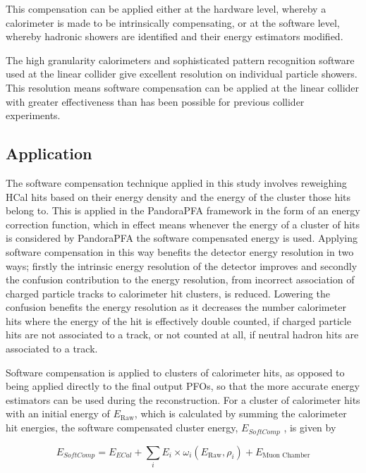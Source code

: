 This compensation can be applied either at the hardware level, whereby a calorimeter is made to be intrinsically compensating, or at the software level, whereby hadronic showers are identified and their energy estimators modified.  

The high granularity calorimeters and sophisticated pattern recognition software used at the linear collider give excellent resolution on individual particle showers.  This resolution means software compensation can be applied at the linear collider with greater effectiveness than has been possible for previous collider experiments.  


\subsection{Application}
The software compensation technique applied in this study involves reweighing HCal \text{ } hits based on their energy density and the energy of the cluster those hits belong to.  This is applied in the PandoraPFA framework in the form of an energy correction function, which in effect means whenever the energy of a cluster of hits is considered by PandoraPFA the software compensated energy is used.  Applying software compensation in this way benefits the detector energy resolution in two ways; firstly the intrinsic energy resolution of the detector improves and secondly the confusion contribution to the energy resolution, from incorrect association of charged particle tracks to calorimeter hit clusters, is reduced.  Lowering the confusion benefits the energy resolution as it decreases the number calorimeter hits where the energy of the hit is effectively double counted, if charged particle hits are not associated to a track, or not counted at all, if neutral hadron hits are associated to a track.   

Software compensation is applied to clusters of calorimeter hits, as opposed to being applied directly to the final output PFOs, so that the more accurate energy estimators can be used during the reconstruction.  For a cluster of calorimeter hits with an initial energy of $E_{\text{Raw}}$, which is  calculated by summing the calorimeter hit energies, the software compensated cluster energy, $E_{SoftComp}$ \cite{Adloff:2012gv}, is given by 

\begin{equation}
E_{SoftComp} = E_{ECal} + \sum_{i} E_{i} \times \omega_{i}(E_{\text{Raw}}, \rho_{i}) + E_{\text{Muon Chamber}}
\label{equ:softcomp}
\end{equation}

